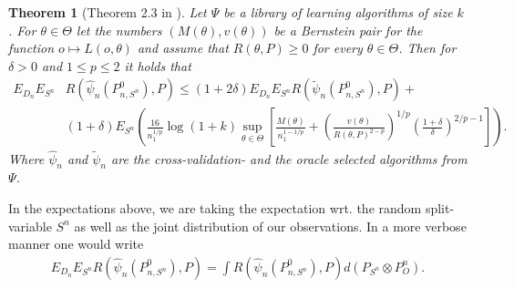 \documentclass[11pt, a4paper]{article}
\newtheorem{theorem}{Theorem}
\theoremstyle{definition}
\theoremstyle{remark}
\newcommand{\ml}{k}
\newcommand{\btheta}{\theta}
\newcommand{\la}{\psi}
\newcommand{\Sn}{S^n}
\newcommand{\lib}{\Psi}
\begin{document}
\begin{theorem}[Theorem 2.3 in \parencite{vaart06}] \label{finitesample}
   Let $ \lib $ be a library of learning algorithms of size $ \ml $. For $ \btheta \in \Theta $ let the numbers $ (M(\btheta) , v(\btheta)) $ be a Bernstein pair for the function $ o \mapsto L(o, \btheta) $ and assume that $ R(\btheta, P) \geq 0 $ for every $ \btheta \in \Theta $. Then for $ \delta > 0 $ and $ 1 \leq p \leq 2 $ it holds that 
   \begin{align*}
       E_{D_n} E_{\Sn} &R(\hat{\la}_n(P_{n, \Sn}^{0}), P) \leq(1 + 2 \delta) E_{D_n} E_{\Sn} R( \tilde{\la}_n(P_{n,\Sn}^{0}), P) +\\
                       &(1 + \delta) E_{\Sn} \left(  \frac{16}{n_1^{1/p}} \log (1 +k) \sup_{\btheta \in \Theta} \left[ \frac{M(\btheta)}{n_1^{1-1/p}} +  \left( \frac{v(\btheta)}{R(\btheta, P)^{2-p}} \right)^{1/p} \left( \frac{1 + \delta}{\delta} \right)^{2/p-1} \right]\right).
   \end{align*}
   Where $ \hat{\la}_n $ and $ \tilde{\la}_n $ are the cross-validation- and the oracle selected algorithms from $ \lib $. 
\end{theorem}
In the expectations above, we are taking the expectation wrt. the random split-variable $ \Sn $ as well as the joint distribution of our observations. In a more verbose manner one would write 
\begin{align*}
    E_{D_n} E_{\Sn}  R(\hat{\la}_n(P_{n, \Sn}^{0}), P) = \int R(\hat{\la}_n(P_{n, \Sn}^{0}), P) d (P_{\Sn} \otimes  P^{n}_O ).
\end{align*}
\end{document}
